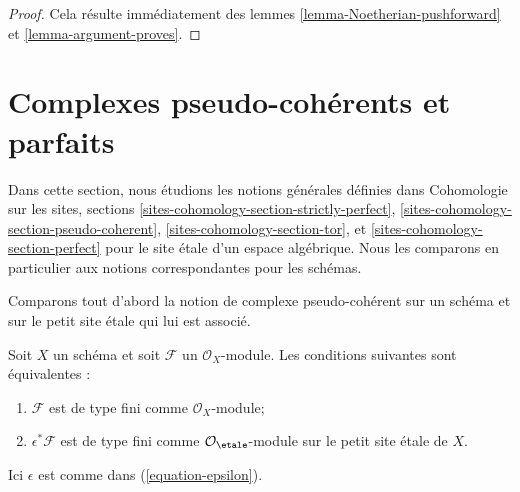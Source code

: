 \begin{proof}
Cela r\'esulte imm\'ediatement des lemmes
\ref{lemma-Noetherian-pushforward} et \ref{lemma-argument-proves}.
\end{proof}













\section{Complexes pseudo-coh\'erents et parfaits}
\label{section-spell-out}

\noindent
Dans cette section, nous \'etudions les notions g\'en\'erales d\'efinies dans
Cohomologie sur les sites, sections
\ref{sites-cohomology-section-strictly-perfect},
\ref{sites-cohomology-section-pseudo-coherent},
\ref{sites-cohomology-section-tor}, et
\ref{sites-cohomology-section-perfect}
pour le site \'etale d'un espace alg\'ebrique. Nous les comparons en particulier
aux notions correspondantes pour les sch\'emas.

\medskip\noindent
Comparons tout d'abord la notion de complexe pseudo-coh\'erent sur un sch\'ema
et sur le petit site \'etale qui lui est associ\'e.

\begin{lemma}
\label{lemma-descend-finite-type}
Soit $X$ un sch\'ema et soit $\mathcal{F}$ un $\mathcal{O}_X$-module.
Les conditions suivantes sont \'equivalentes :
\begin{enumerate}
\item $\mathcal{F}$ est de type fini comme $\mathcal{O}_X$-module;
\item $\epsilon^*\mathcal{F}$ est de type fini comme
$\mathcal{O}_\etale$-module sur le petit site \'etale de $X$.
\end{enumerate}
Ici $\epsilon$ est comme dans (\ref{equation-epsilon}).
\end{lemma}

